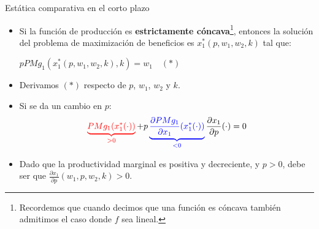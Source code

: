 \documentclass{beamer}
\theoremstyle{definition}
\begin{document}
\begin{frame}[noframenumbering]{Est\'atica comparativa en el corto plazo}
	\begin{itemize}
		\item Si la funci\'{o}n de producci\'{o}n es \textbf{estrictamente c\'{o}ncava}\footnote{Recordemos que cuando decimos que una función es cóncava también admitimos el caso donde $f$ sea lineal.}, entonces la soluci\'{o}n
del problema de maximizaci\'{o}n de beneficios es $x_{1}^*(p,w_{1},w_{2},k)$
tal que:
\begin{center}
$pPMg_{1}(x_{1}^*(p,w_{1},w_{2},k),k)=w_{1} \quad (*)$ 
\end{center}
\item Derivamos $(*)$ respecto de $p$, $w_1$, $w_2$ y $k$.
		\item Si se da un cambio en $p$:
		\begin{equation*}
	\color{red}	\underbrace{PMg_{1}(x_{1}^{*}(\cdot))}_{>0}\color{black}+p\color{blue}\underbrace{\frac{\partial PMg_{1}}{\partial{x_{1}}}(x_{1}^{*}(\cdot))}_{<0}\color{black}\frac{\partial x_{1}}{\partial p}(\cdot)=0
		\end{equation*}
		\item Dado que la productividad marginal es \color{red}positiva \color{black}y \color{blue}decreciente\color{black}, y $p>0$, debe
ser que $\frac{\partial x_{1}}{\partial p}(w_{1},p,w_{2},k)>0$.
	\end{itemize}
\end{frame}	
\end{document}
